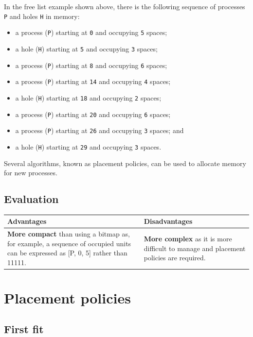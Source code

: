 \documentclass[a4paper]{systems-software}
\begin{document}
In the free list example shown above, there is the following sequence of processes \texttt{P} and holes \texttt{H} in memory:
\begin{itemize}
	\item a process (\texttt{P}) starting at \texttt{0} and occupying \texttt{5} spaces;
	\item a hole (\texttt{H}) starting at \texttt{5} and occupying \texttt{3} spaces;
	\item a process (\texttt{P}) starting at \texttt{8} and occupying \texttt{6} spaces;
	\item a process (\texttt{P}) starting at \texttt{14} and occupying \texttt{4} spaces;
	\item a hole (\texttt{H}) starting at \texttt{18} and occupying \texttt{2} spaces;
	\item a process (\texttt{P}) starting at \texttt{20} and occupying \texttt{6} spaces;
	\item a process (\texttt{P}) starting at \texttt{26} and occupying \texttt{3} spaces; and
	\item a hole (\texttt{H}) starting at \texttt{29} and occupying \texttt{3} spaces.
\end{itemize}

Several algorithms, known as placement policies, can be used to allocate memory for new processes.


\subsection*{Evaluation}

\begin{longtabu} to \textwidth {| X[1,l] | X[1,l] |}
    \hline
    \textbf{Advantages} & \textbf{Disadvantages}
	\\ \hline
	\textbf{More compact} than using a bitmap as, for example, a sequence of occupied units can be expressed as [P, 0, 5] rather than 11111. & \textbf{More complex} as it is more difficult to manage and placement policies are required.
	\\ \hline
\end{longtabu}


\section*{Placement policies}

\subsection*{First fit}
\end{document}

